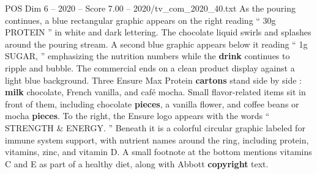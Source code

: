 \begin{textsample}{POS Dim 6 – 2020 – Score 7.00 – 2020/tv\_com\_2020\_40.txt}
As the pouring continues, a blue rectangular graphic appears on the right reading “ 30g PROTEIN ” in white and dark lettering.
The chocolate liquid swirls and splashes around the pouring stream.
A second blue graphic appears below it reading “ 1g SUGAR, ” emphasizing the nutrition numbers while the \textbf{drink} continues to ripple and bubble.
The commercial ends on a clean product display against a light blue background.
Three Ensure Max Protein \textbf{cartons} stand side by side : \textbf{milk} chocolate, French vanilla, and café mocha.
Small flavor-related items sit in front of them, including chocolate \textbf{pieces}, a vanilla flower, and coffee beans or mocha \textbf{pieces}.
To the right, the Ensure logo appears with the words “ STRENGTH \& ENERGY. ” Beneath it is a colorful circular graphic labeled for immune system support, with nutrient names around the ring, including protein, vitamins, zinc, and vitamin D.
A small footnote at the bottom mentions vitamins C and E as part of a healthy diet, along with Abbott \textbf{copyright} text.

\end{textsample}

